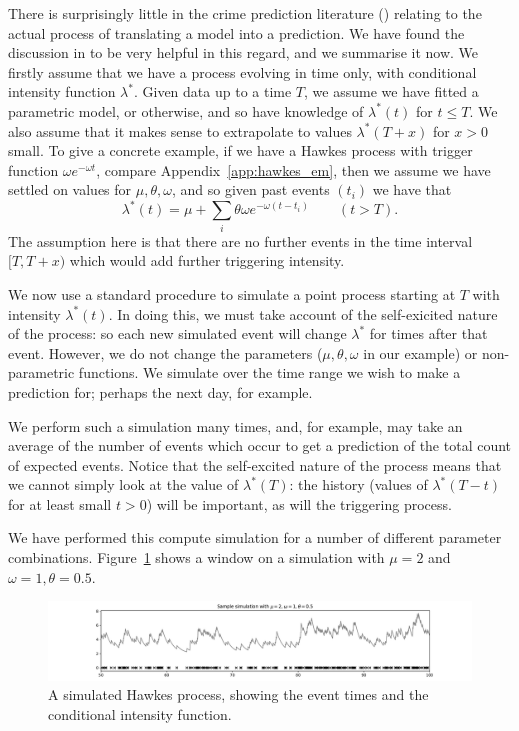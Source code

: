 \documentclass[twoside,a4paper]{article}
\theoremstyle{plain}
\theoremstyle{definition}
\begin{document}
There is surprisingly little in the crime prediction literature (\cite{sepp, sepp2, rc})
relating to the actual process of translating a model into a prediction.  We have found
the discussion in \cite[Section~1]{vj} to be very helpful in this regard, and we summarise
it now.  We firstly assume that we have a process evolving in time only, with conditional
intensity function $\lambda^*$.  Given data up to a time $T$, we assume we have fitted a
parametric model, or otherwise, and so have knowledge of $\lambda^*(t)$ for $t\leq T$.
We also assume that it makes sense to extrapolate to values $\lambda^*(T+x)$ for $x>0$ small.
To give a concrete example, if we have a Hawkes process with trigger function
$\omega e^{-\omega t}$, compare Appendix~\ref{app:hawkes_em}, then we assume we have settled
on values for $\mu, \theta, \omega$, and so given past events $(t_i)$ we have that
\[ \lambda^*(t) = \mu + \sum_i \theta \omega e^{-\omega (t-t_i)}
\qquad (t>T). \]
The assumption here is that there are no further events in the time interval $[T, T+x)$ which
would add further triggering intensity.

We now use a standard procedure to simulate a point process starting at $T$ with intensity
$\lambda^*(t)$.  In doing this, we must take account of the self-exicited nature of the
process: so each new simulated event will change $\lambda^*$ for times after that event.
However, we do not change the parameters ($\mu, \theta, \omega$ in our example) or non-parametric
functions.  We simulate over the time range we wish to make a prediction for; perhaps the
next day, for example.

We perform such a simulation many times, and, for example, may take an average of the number
of events which occur to get a prediction of the total count of expected events.  Notice
that the self-excited nature of the process means that we cannot simply look at the
value of $\lambda^*(T)$: the history (values of $\lambda^*(T-t)$ for at least small $t>0$)
will be important, as will the triggering process.

We have performed this compute simulation for a number of different parameter combinations.
Figure~\ref{fig:hawkes_sample} shows a window on a simulation with $\mu=2$ and $\omega=1,
\theta=0.5$.

\begin{figure}
  \includegraphics[width=\textwidth]{../notebooks/hawkes_sample.pdf}
  \caption{A simulated Hawkes process, showing the event times and the conditional intensity
function.}
  \label{fig:hawkes_sample}
\end{figure}
\end{document}
